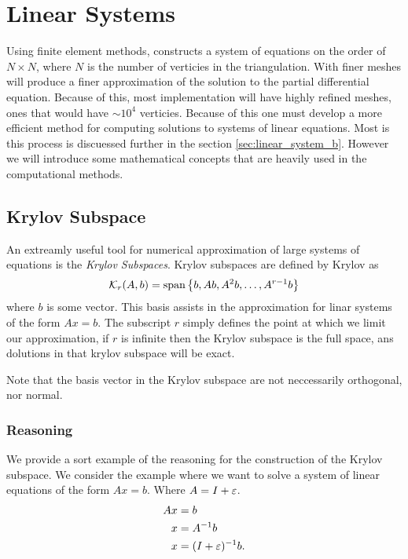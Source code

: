\documentclass[../fem.tex]{subfile}
\begin{document}
\section{Linear Systems}%
\label{sec:linear_systems}

Using finite element methods, constructs a system of equations on the order of
$N\times N$, where $N$ is the number of verticies in the triangulation. With
finer meshes will produce a finer approximation of the solution to the partial
differential equation. Because of this, most implementation will have highly
refined meshes, ones that would have $\sim 10^4$ verticies. Because of this one
must develop a more efficient method for computing solutions to systems of
linear equations. Most is this process is discuessed further in the
section \ref{sec:linear_system_b}. However we will introduce some mathematical
concepts that are heavily used in the computational methods.

\subsection{Krylov Subspace}%
\label{sub:krylov_subspace}

An extreamly useful tool for numerical approximation of large systems of
equations is the \textit{Krylov Subspaces}. Krylov subspaces are defined by
Krylov \cite{KRYLOV} as
\begin{align*}
  \mathcal{K}_r(A,b)=\text{span}\left\{b,Ab,A^2b,\ldots,A^{r-1}b\right\}
\end{align*}
where $b$ is some vector. This basis assists in the approximation for linar
systems of the form $Ax=b$. The subscript $r$ simply defines the point at which
we limit our approximation, if $r$ is infinite then the Krylov subspace is the
full space, ans dolutions in that krylov subspace will be exact.

Note that the basis vector in the Krylov subspace are not neccessarily
orthogonal, nor normal.

\subsubsection{Reasoning}%
\label{ssub:reasoning}

We provide a sort example of the reasoning for the construction of the Krylov
subspace. We consider the example where we want to solve a system of linear
equations of the form $Ax=b$. Where $A=I+{\varepsilon}$.
\begin{align*}
  Ax&=b\\
  x&=A^{-1}b\\
  x&=(I+{\varepsilon})^{-1}b.
\end{align*}
\end{document}
